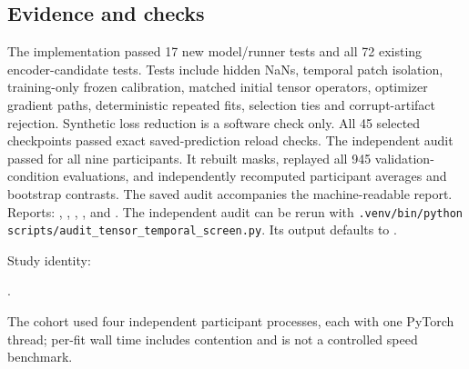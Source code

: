 \subsection*{Evidence and checks}
The implementation passed 17 new model/runner tests and all 72 existing
encoder-candidate tests. Tests include hidden NaNs, temporal patch isolation,
training-only frozen calibration, matched initial tensor operators, optimizer
gradient paths, deterministic repeated fits, selection ties and corrupt-artifact
rejection. Synthetic loss reduction is a software check only.
All 45 selected checkpoints passed exact saved-prediction reload checks.
The independent audit passed for all nine participants. It rebuilt masks,
replayed all 945 validation-condition evaluations, and independently recomputed
participant averages and bootstrap contrasts. The saved audit accompanies the
machine-readable report.
Reports: ,
, , , and
. The independent audit can be rerun with
\verb|.venv/bin/python scripts/audit_tensor_temporal_screen.py|.
Its output defaults to .
\par Study identity:\par
{}.
\par
The cohort used four independent participant processes, each with one PyTorch
thread; per-fit wall time includes contention and is not a controlled speed benchmark.
